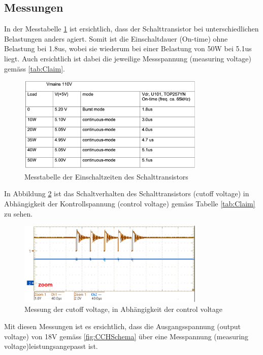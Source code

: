 \subsection{Messungen}\label{sec:Messungen}

In der Messtabelle \ref{fig:Schalttransistor} ist ersichtlich, dass der Schalttransistor bei unterschiedlichen Belastungen anders agiert. Somit ist die Einschaltdauer (On-time) ohne Belastung bei 1.8us, wobei sie wiederum bei einer Belastung von 50W bei 5.1us liegt. Auch ersichtlich ist dabei die jeweilige Messspannung (measuring voltage) gemäss \ref{tab:Claim}.

\begin{figure}[h!]
	\centering
	\includegraphics[width=0.8\textwidth]{graphics/Messtabelle}
	\caption{Messtabelle der Einschaltzeiten des Schalttransistors}
	\label{fig:Schalttransistor}
\end{figure} 

In Abbildung \ref{fig:cutoff} ist das Schaltverhalten des Schalttransistors (cutoff voltage) in Abhängigkeit der Kontrollspannung (control voltage) gemäss Tabelle \ref{tab:Claim} zu sehen. \\

\begin{figure}[h!]
	\centering
	\includegraphics[width=0.8\textwidth]{graphics/cutoff}
	\caption{Messung der cutoff voltage, in Abhängigkeit der control voltage}
	\label{fig:cutoff}
\end{figure} 

Mit diesen Messungen ist es ersichtlich, dass die Ausgangsspannung (output voltage) von 18V gemäss \ref{fig:CCHSchema} über eine Messpannung (measuring voltage)leistungsangepasst ist.

\newpage



 
 
 
